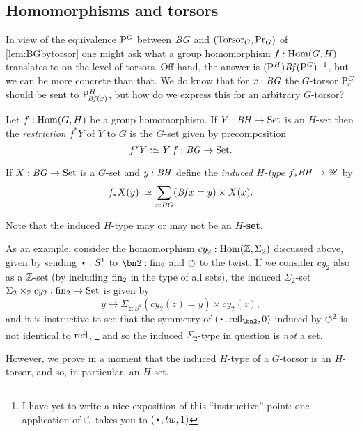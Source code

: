\subsection{Homomorphisms and torsors}
\label{sec:homotor}
In view of the equivalence $\mathrm{P}_{\!}^G$ between $\mathit{B}\mathit{G}$ and $(\mathrm{Torsor}_G,\mathrm{Pr}_{{G}})$ of \cref{lem:BGbytorsor} one might ask what a group homomorphism  $f:\Hom(G,H)$ translates to on the level of torsors.  Off-hand, the answer is $(\mathrm{P}_{\!}^H)\mathit{B}\mathit{f}(\mathrm{P}_{\!}^G)^{-1}$, but we can be more concrete than that.  We do know that for $x:\mathit{B}\mathit{G}$ the $G$-torsor $\mathrm{P}_{\!x}^G$ should be sent to $\mathrm{P}_{\!\mathit{B}\mathit{f}(x)}^H$, but how do we express this for an arbitrary $G$-torsor?
\begin{definition}
  \label{def:restrictandinduce}
  Let $f:\Hom(G,H)$ be a group homomorphism.  If $Y:\mathit{B}\mathit{H}\to\mathrm{Set}$ is an $H$-set then the \emph{restriction} $f^*Y$ of $Y$ to $G$ is the $G$-set given by precomposition 
$$f^*Y\defequi Y\, f:\BG\to\Set.$$  

If $X:\mathit{B}\mathit{G}\to\mathrm{Set}$ is a $G$-set and $y:\mathit{B}\mathit{H}$ define 
the \emph{induced $H$-type} $f_*\mathit{B}\mathit{H}\to{\mathscr{U}}$ by
$$f_*X(y)\defequi\sum_{x:\BG}(\Bf x =y)\times X(x).$$
\end{definition}
\begin{remark}
  Note that the induced $H$-type may or may not be an $H$-{\bf set}.

  As an example, consider the homomorphism $cy_2:\Hom(\ZZ,\Sigma_2)$ discussed above, given by sending $\base:S^1$ to $\bn 2:\fin_2$ and $\circlearrowleft$ to the twist.
  If we consider $cy_2$ also as a $\mathbb{Z}$-set (by including $\fin_2$ in the type of all sets), the induced $\Sigma_2$-set $\Sigma_2\times_{\ZZ}cy_2:\fin_2\to\Set$ is given by 
  $$y\mapsto \Sigma_{z:S^1}(cy_2(z)=y)\times cy_2(z),$$
  and it is instructive to see that the symmetry of $(\base,\refl{\bn 2},0)$
  induced by $\circlearrowleft^2$ is not identical to $\refl{}$,
  \footnote{I have yet to write a nice exposition of this ``instructive'' point: one application of $\circlearrowleft$ takes you to $(\base,tw,1)$}
  and so the induced $\Sigma_2$-type in question is \emph{not} a set.  
  
  However, we prove in a moment that the induced $H$-type of a $G$-torsor is an $H$-torsor, and so, in particular, an $H$-set.
\end{remark}

